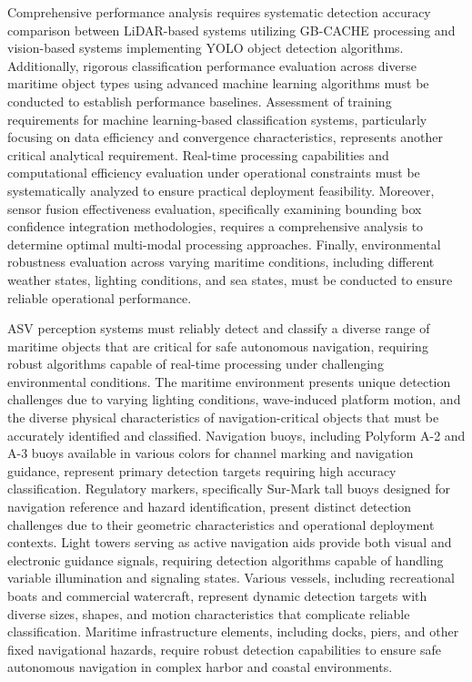 \documentclass{erauthesis}
\begin{document}
Comprehensive performance analysis requires systematic detection accuracy comparison between \ac{LiDAR}-based systems utilizing \ac{GB-CACHE} processing and vision-based systems implementing \ac{YOLO} object detection algorithms. Additionally, rigorous classification performance evaluation across diverse maritime object types using advanced machine learning algorithms must be conducted to establish performance baselines. Assessment of training requirements for machine learning-based classification systems, particularly focusing on data efficiency and convergence characteristics, represents another critical analytical requirement. Real-time processing capabilities and computational efficiency evaluation under operational constraints must be systematically analyzed to ensure practical deployment feasibility. Moreover, sensor fusion effectiveness evaluation, specifically examining bounding box confidence integration methodologies, requires a comprehensive analysis to determine optimal multi-modal processing approaches. Finally, environmental robustness evaluation across varying maritime conditions, including different weather states, lighting conditions, and sea states, must be conducted to ensure reliable operational performance.

\ac{ASV} perception systems must reliably detect and classify a diverse range of maritime objects that are critical for safe autonomous navigation, requiring robust algorithms capable of real-time processing under challenging environmental conditions. The maritime environment presents unique detection challenges due to varying lighting conditions, wave-induced platform motion, and the diverse physical characteristics of navigation-critical objects that must be accurately identified and classified. Navigation buoys, including Polyform A-2 and A-3 buoys available in various colors for channel marking and navigation guidance, represent primary detection targets requiring high accuracy classification. Regulatory markers, specifically Sur-Mark tall buoys designed for navigation reference and hazard identification, present distinct detection challenges due to their geometric characteristics and operational deployment contexts. Light towers serving as active navigation aids provide both visual and electronic guidance signals, requiring detection algorithms capable of handling variable illumination and signaling states. Various vessels, including recreational boats and commercial watercraft, represent dynamic detection targets with diverse sizes, shapes, and motion characteristics that complicate reliable classification. Maritime infrastructure elements, including docks, piers, and other fixed navigational hazards, require robust detection capabilities to ensure safe autonomous navigation in complex harbor and coastal environments.
\end{document}
